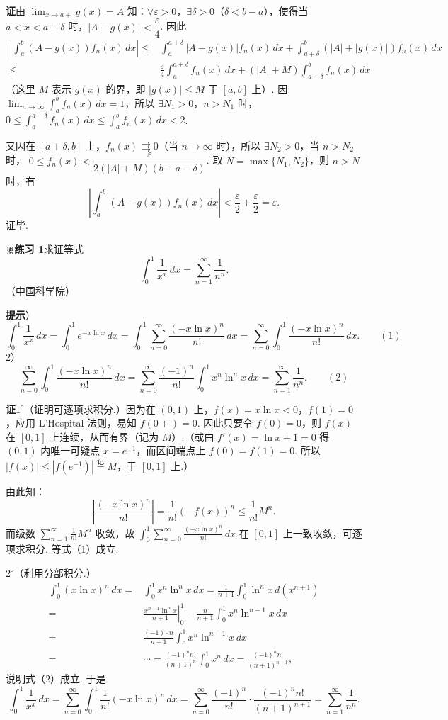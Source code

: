 \documentclass[UTF8,12pt,a4paper,fontset=fandol]{ctexart}
\begin{document}
\noindent\textbf{证}\quad 由 $\displaystyle\lim_{x\to a+}g(x)=A$ 知：$\forall\varepsilon>0$，$\exists\delta>0$（$\delta<b-a$），使得当
$a<x<a+\delta$ 时，$|A-g(x)|<\dfrac\varepsilon4$. 因此
\[
\begin{aligned}
\left|\int_a^b(A-g(x))f_n(x)\,dx\right|
\le{}&\int_a^{a+\delta}|A-g(x)|f_n(x)\,dx
+\int_{a+\delta}^b(|A|+|g(x)|)f_n(x)\,dx\\
\le{}&\frac\varepsilon4\int_a^{a+\delta}f_n(x)\,dx
+(|A|+M)\int_{a+\delta}^b f_n(x)\,dx
\end{aligned}
\]
（这里 $M$ 表示 $g(x)$ 的界，即 $|g(x)|\le M$ 于 $[a,b]$ 上）. 因
$\displaystyle\lim_{n\to\infty}\int_a^b f_n(x)\,dx=1$，所以
$\exists N_1>0$，$n>N_1$ 时，
$0\le\displaystyle\int_a^{a+\delta}f_n(x)\,dx\le\int_a^b f_n(x)\,dx<2$.

又因在 $[a+\delta,b]$ 上，$f_n(x)\rightrightarrows0$（当 $n\to\infty$ 时），所以
$\exists N_2>0$，当 $n>N_2$ 时，
$0\le f_n(x)<\dfrac{\varepsilon}{2(|A|+M)(b-a-\delta)}$. 取
$N=\max\{N_1,N_2\}$，则 $n>N$ 时，有
\[
  \left|\int_a^b(A-g(x))f_n(x)\,dx\right|
  <\frac\varepsilon2+\frac\varepsilon2=\varepsilon.
\]
证毕.

\noindent\textbf{※练习 1}\quad 求证等式
\[
  \int_0^1\frac1{x^x}\,dx=\sum_{n=1}^{\infty}\frac1{n^n}.
\]
（中国科学院）

\noindent\textbf{提示}）
\[
  \int_0^1\frac1{x^x}\,dx
  =\int_0^1 e^{-x\ln x}\,dx
  =\int_0^1\sum_{n=0}^{\infty}\frac{(-x\ln x)^n}{n!}\,dx
  =\sum_{n=0}^{\infty}\int_0^1\frac{(-x\ln x)^n}{n!}\,dx.
\qquad(1)
\]
2）
\[
  \sum_{n=0}^{\infty}\int_0^1\frac{(-x\ln x)^n}{n!}\,dx
  =\sum_{n=0}^{\infty}\frac{(-1)^n}{n!}\int_0^1x^n\ln^n x\,dx
  =\sum_{n=1}^{\infty}\frac1{n^n}.
\qquad(2)
\]

\noindent\textbf{证}\quad $1^\circ$（证明可逐项求积分.）因为在 $(0,1)$ 上，$f(x)=x\ln x<0$，$f(1)=0$，应用 L'Hospital 法则，易知
$f(0+)=0$. 因此只要令 $f(0)=0$，则 $f(x)$ 在 $[0,1]$ 上连续，从而有界（记为 $M$）.（或由
$f'(x)=\ln x+1=0$ 得 $(0,1)$ 内唯一可疑点 $x=e^{-1}$，而区间端点上 $f(0)=f(1)=0$. 所以
$|f(x)|\le |f(e^{-1})|\overset{\text{记}}=M$，于 $[0,1]$ 上.）

由此知：
\[
  \left|\frac{(-x\ln x)^n}{n!}\right|
  =\frac1{n!}(-f(x))^n\le\frac1{n!}M^n.
\]
而级数 $\displaystyle\sum_{n=1}^{\infty}\frac1{n!}M^n$ 收敛，故
$\displaystyle\int_0^1\sum_{n=0}^{\infty}\frac{(-x\ln x)^n}{n!}\,dx$
在 $[0,1]$ 上一致收敛，可逐项求积分. 等式（1）成立.

$2^\circ$（利用分部积分.）
\[
\begin{aligned}
\int_0^1(x\ln x)^n\,dx
={}&\int_0^1x^n\ln^n x\,dx
=\frac1{n+1}\int_0^1\ln^n x\,d(x^{n+1})\\
={}&\left.\frac{x^{n+1}\ln^n x}{n+1}\right|_0^1
-\frac n{n+1}\int_0^1x^n\ln^{n-1}x\,dx\\
={}&\frac{(-1)\cdot n}{n+1}\int_0^1x^n\ln^{n-1}x\,dx\\
={}&\cdots=\frac{(-1)^n n!}{(n+1)^n}\int_0^1x^n\,dx
=\frac{(-1)^n n!}{(n+1)^{n+1}},
\end{aligned}
\]
说明式（2）成立. 于是
\[
  \int_0^1\frac1{x^x}\,dx
  =\sum_{n=0}^{\infty}\int_0^1\frac1{n!}(-x\ln x)^n\,dx
  =\sum_{n=0}^{\infty}\frac{(-1)^n}{n!}\cdot\frac{(-1)^n n!}{(n+1)^{n+1}}
  =\sum_{n=1}^{\infty}\frac1{n^n}.
\]
\end{document}
